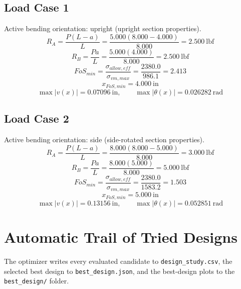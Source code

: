 \documentclass[11pt]{article}
\begin{document}
\subsection*{Load Case 1}
Active bending orientation: upright (upright section properties).
\[R_A = \frac{P(L-a)}{L} = \frac{5.000(8.000-4.000)}{8.000} = 2.500\ \mathrm{lbf}\]
\[R_B = \frac{Pa}{L} = \frac{5.000(4.000)}{8.000} = 2.500\ \mathrm{lbf}\]
\[FoS_{min} = \frac{\sigma_{allow,eff}}{\sigma_{vm,max}} = \frac{2380.0}{986.1} = 2.413\]
\[x_{FoS,min} = 4.000\ \mathrm{in}\]
\[\max |v(x)| = 0.07096\ \mathrm{in}, \qquad \max |\theta(x)| = 0.026282\ \mathrm{rad}\]
\subsection*{Load Case 2}
Active bending orientation: side (side-rotated section properties).
\[R_A = \frac{P(L-a)}{L} = \frac{8.000(8.000-5.000)}{8.000} = 3.000\ \mathrm{lbf}\]
\[R_B = \frac{Pa}{L} = \frac{8.000(5.000)}{8.000} = 5.000\ \mathrm{lbf}\]
\[FoS_{min} = \frac{\sigma_{allow,eff}}{\sigma_{vm,max}} = \frac{2380.0}{1583.2} = 1.503\]
\[x_{FoS,min} = 5.000\ \mathrm{in}\]
\[\max |v(x)| = 0.13156\ \mathrm{in}, \qquad \max |\theta(x)| = 0.052851\ \mathrm{rad}\]

\section*{Automatic Trail of Tried Designs}
The optimizer writes every evaluated candidate to \texttt{design\_study.csv}, the selected best design to \texttt{best\_design.json}, and the best-design plots to the \texttt{best\_design/} folder.
\end{document}

